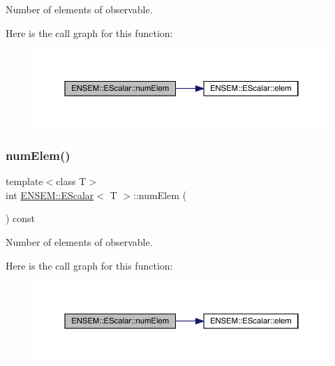 Number of elements of observable. 

Here is the call graph for this function\+:
\nopagebreak
\begin{figure}[H]
\begin{center}
\leavevmode
\includegraphics[width=350pt]{d0/d82/classENSEM_1_1EScalar_a63584568dc8b1817a57656cc072205b2_cgraph}
\end{center}
\end{figure}
\mbox{\label{classENSEM_1_1EScalar_a63584568dc8b1817a57656cc072205b2}} 
\subsubsection{\texorpdfstring{numElem()}{numElem()}\hspace{0.1cm}{\footnotesize\ttfamily [3/3]}}
{\footnotesize\ttfamily template$<$class T$>$ \\
int \mbox{\hyperlink{classENSEM_1_1EScalar}{E\+N\+S\+E\+M\+::\+E\+Scalar}}$<$ T $>$\+::num\+Elem (\begin{DoxyParamCaption}{ }\end{DoxyParamCaption}) const\hspace{0.3cm}{\ttfamily [inline]}}



Number of elements of observable. 

Here is the call graph for this function\+:
\nopagebreak
\begin{figure}[H]
\begin{center}
\leavevmode
\includegraphics[width=350pt]{d0/d82/classENSEM_1_1EScalar_a63584568dc8b1817a57656cc072205b2_cgraph}
\end{center}
\end{figure}
\mbox{\label{classENSEM_1_1EScalar_ab4bd572c2f331fadf6914f406bce991f}} 
